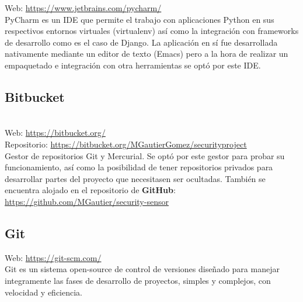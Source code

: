 Web: \url{https://www.jetbrains.com/pycharm/}\\

PyCharm es un IDE que permite el trabajo con aplicaciones Python en sus respectivos entornos virtuales (virtualenv) así como la integración con frameworks de desarrollo como es el caso de Django. La aplicación en sí fue desarrollada nativamente mediante un editor de texto (Emacs) pero a la hora de realizar un empaquetado e integración con otra herramientas se optó por este IDE. \\

\subsection{Bitbucket}

\\

Web: \url{https://bitbucket.org/}\\
Repositorio: \url{https://bitbucket.org/MGautierGomez/securityproject}\\

Gestor de repositorios Git y Mercurial. Se optó por este gestor para probar su funcionamiento, así como la posibilidad de tener repositorios privados para desarrollar partes del proyecto que necesitasen ser ocultadas. También se encuentra alojado en el repositorio de \textbf{GitHub}: \url{https://github.com/MGautier/security-sensor}\\


\subsection{Git}


Web: \url{https://git-scm.com/}\\

Git es un sistema open-source de control de versiones diseñado para manejar integramente las fases de desarrollo de proyectos, simples y complejos, con velocidad y eficiencia.\\

